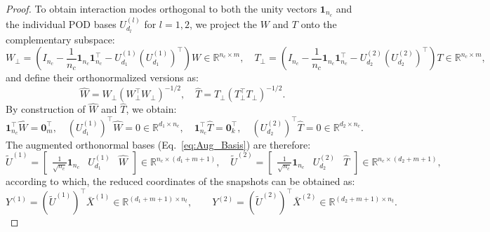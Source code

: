 \documentclass[10pt,a4paper]{amsart}
\begin{document}
\begin{proof}
To obtain interaction modes orthogonal to both the unity vectors $\mathbf{1}_{n_c}$ and the individual POD bases $U^{(l)}_{d_l}$ for $l=1,2$, we project the $W$ and $T$ onto the complementary subspace: 
\begin{equation}
    W_\perp = \left(I_{n_c} - \frac{1}{n_c}\mathbf{1}_{n_c}\mathbf{1}^{\top}_{n_c} - U_{d_1}^{(1)} (U_{d_1}^{(1)})^\top\right)W \in \mathbb{R}^{n_c\times m}, \quad T_\perp = \left(I_{n_c} - \frac{1}{n_c} \mathbf{1}_{n_c}\mathbf{1}^{\top}_{n_c}- U_{d_2}^{(2)} (U_{d_2}^{(2)})^\top\right)T \in \mathbb{R}^{n_c\times m},
\end{equation}
and define their orthonormalized versions as:
\begin{equation}
    \hat W = W_\perp (W_\perp^\top W
    _\perp)^{-1/2}, \quad  \hat T = T_\perp (T_\perp^\top T_\perp)^{-1/2}.
\end{equation}
By construction of $\hat{W}$ and $\hat{T}$, we obtain:
\begin{equation} \label{eq:cross_ortho}
    \mathbf{1}_{n_c}^\top \hat{W}= \mathbf{0}^\top_m, \quad (U_{d_1}^{(1)})^\top \hat{W}=0\in \mathbb{R}^{d_1 \times n_c}, \quad
    \mathbf{1}_{n_c}^\top \hat{T}= \mathbf{0}^\top_k, \quad (U_{d_2}^{(2)})^\top \hat{T}=0\in \mathbb{R}^{d_2 \times n_c}.
\end{equation}
The augmented orthonormal bases (Eq.~\eqref{eq:Aug_Basis}) are therefore:
\begin{equation} \label{eq:Aug_Basis_proof}
    \tilde U^{(1)} = \begin{bmatrix} \frac{1}{\sqrt{n_c}}\mathbf{1}_{n_c} & U_{d_1}^{(1)} & \hat W \end{bmatrix} \in \mathbb{R}^{n_c \times (d_1+m+1)}, \quad
\tilde U^{(2)} = \begin{bmatrix} \frac{1}{\sqrt{n_c}}\mathbf{1}_{n_c} & U_{d_2}^{(2)} & \hat T \end{bmatrix} \in \mathbb{R}^{n_c \times (d_2+m+1)},
\end{equation} 
according to which, the reduced coordinates of the snapshots can be obtained as:
\begin{equation}
Y^{(1)} = (\tilde{U}^{(1)})^\top \bar X^{(1)} \in \mathbb{R}^{(d_1+m+1) \times n_t}, \qquad
Y^{(2)} = (\tilde{U}^{(2)})^\top \bar X^{(2)} \in \mathbb{R}^{(d_2+m+1) \times n_t}.
\end{equation}


\end{proof}
\end{document}
